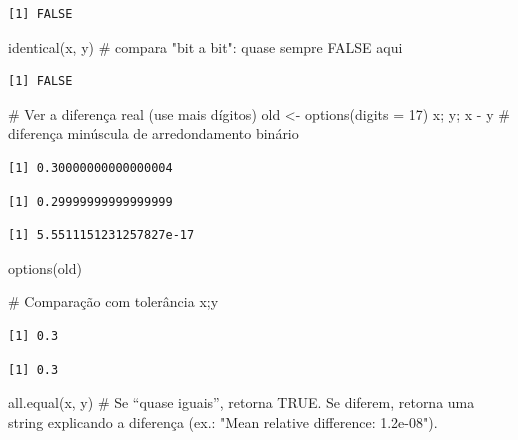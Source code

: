 \documentclass[
  letterpaper,
  DIV=11,
  numbers=noendperiod]{scrreprt}
\newenvironment{Shaded}{\begin{snugshade}}{\end{snugshade}}
\newcommand{\AttributeTok}[1]{\textcolor[rgb]{0.40,0.45,0.13}{#1}}
\newcommand{\CommentTok}[1]{\textcolor[rgb]{0.37,0.37,0.37}{#1}}
\newcommand{\DecValTok}[1]{\textcolor[rgb]{0.68,0.00,0.00}{#1}}
\newcommand{\FunctionTok}[1]{\textcolor[rgb]{0.28,0.35,0.67}{#1}}
\newcommand{\NormalTok}[1]{\textcolor[rgb]{0.00,0.23,0.31}{#1}}
\newcommand{\OtherTok}[1]{\textcolor[rgb]{0.00,0.23,0.31}{#1}}
\newcommand{\SpecialCharTok}[1]{\textcolor[rgb]{0.37,0.37,0.37}{#1}}
\begin{document}
\begin{verbatim}
[1] FALSE
\end{verbatim}

\begin{Shaded}
\begin{Highlighting}[]
\FunctionTok{identical}\NormalTok{(x, y)              }\CommentTok{\# compara "bit a bit": quase sempre FALSE aqui}
\end{Highlighting}
\end{Shaded}

\begin{verbatim}
[1] FALSE
\end{verbatim}

\begin{Shaded}
\begin{Highlighting}[]
\CommentTok{\# Ver a diferença real (use mais dígitos)}
\NormalTok{old }\OtherTok{\textless{}{-}} \FunctionTok{options}\NormalTok{(}\AttributeTok{digits =} \DecValTok{17}\NormalTok{)}
\NormalTok{x; y; x }\SpecialCharTok{{-}}\NormalTok{ y                  }\CommentTok{\# diferença minúscula de arredondamento binário}
\end{Highlighting}
\end{Shaded}

\begin{verbatim}
[1] 0.30000000000000004
\end{verbatim}

\begin{verbatim}
[1] 0.29999999999999999
\end{verbatim}

\begin{verbatim}
[1] 5.5511151231257827e-17
\end{verbatim}

\begin{Shaded}
\begin{Highlighting}[]
\FunctionTok{options}\NormalTok{(old)}

\CommentTok{\# Comparação com tolerância}
\NormalTok{x;y}
\end{Highlighting}
\end{Shaded}

\begin{verbatim}
[1] 0.3
\end{verbatim}

\begin{verbatim}
[1] 0.3
\end{verbatim}

\begin{Shaded}
\begin{Highlighting}[]
\FunctionTok{all.equal}\NormalTok{(x, y)              }\CommentTok{\# Se “quase iguais”, retorna TRUE. Se diferem, retorna uma string explicando a diferença (ex.: "Mean relative difference: 1.2e{-}08").}
\end{Highlighting}
\end{Shaded}
\end{document}
